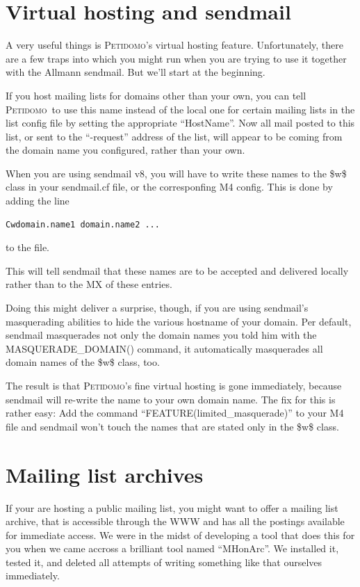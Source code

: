 \documentclass[a4paper,10pt]{scrreprt}
\newcommand{\Petidomo}{{\scshape Peti\-domo}}
\begin{document}
\section{Virtual hosting and sendmail}
\label{virtual hosting and sendmail}

A very useful things is \Petidomo's virtual hosting feature.
Unfortunately, there are a few traps into which you might run when you
are trying to use it together with the Allmann sendmail. But we'll
start at the beginning.

If you host mailing lists for domains other than your own, you can
tell \Petidomo\ to use this name instead of the local one for certain
mailing lists in the list config file by setting the appropriate
``HostName''. Now all mail posted to this list, or sent to the
``-request'' address of the list, will appear to be coming from the
domain name you configured, rather than your own.

When you are using sendmail v8, you will have to write these names to
the \$w\$ class in your sendmail.cf file, or the corresponfing M4
config. This is done by adding the line
\begin{verbatim}
Cwdomain.name1 domain.name2 ...
\end{verbatim}
to the file.

This will tell sendmail that these names are to be accepted and
delivered locally rather than to the MX of these entries.

Doing this might deliver a surprise, though, if you are using
sendmail's masquerading abilities to hide the various hostname of your
domain. Per default, sendmail masquerades not only the domain names
you told him with the MASQUERADE\_DOMAIN() command, it automatically
masquerades all domain names of the \$w\$ class, too.

The result is that \Petidomo's fine virtual hosting is gone
immediately, because sendmail will re-write the name to your own
domain name. The fix for this is rather easy: Add the command
``FEATURE(limited\_masquerade)'' to your M4 file and sendmail won't
touch the names that are stated only in the \$w\$ class.

\section{Mailing list archives}
\label{mailing list archives}

If your are hosting a public mailing list, you might want to offer a
mailing list archive, that is accessible through the WWW and has all
the postings available for immediate access. We were in the midst of
developing a tool that does this for you when we came accross a
brilliant tool named ``MHonArc''. We installed it, tested it, and
deleted all attempts of writing something like that ourselves
immediately.
\end{document}
